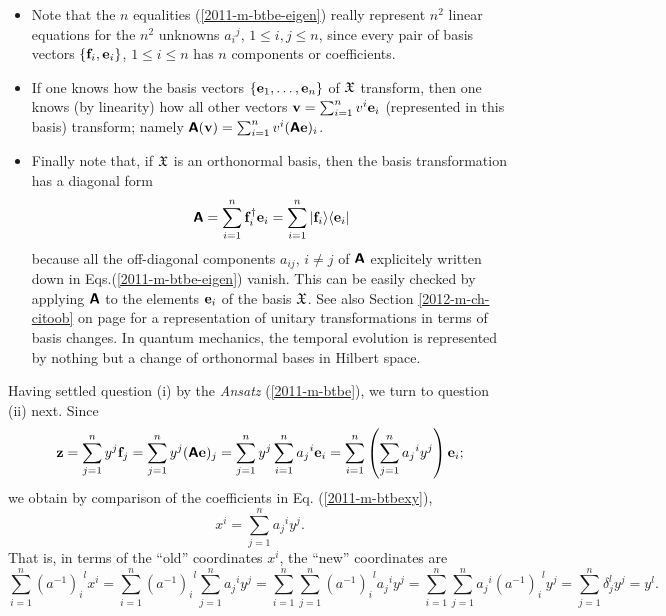 \begin{itemize}
\item
Note   that the $n$ equalities (\ref {2011-m-btbe-eigen})
really represent $n^2$ linear equations for the $n^2$
unknowns ${a_i}^j$, $1\le i,j\le n$, since every pair of basis vectors
$\{{\bf f}_i,{\bf e}_i\}$, $1\le i\le n$ has $n$ components or coefficients.

\item
If one knows how the basis vectors
$
\{
{\bf e}_1,
\ldots ,
{\bf e}_n
\}$ of ${\frak X}$    transform, then one knows (by linearity) how
all other vectors
${\bf v}=
\sum_{i=1}^n v^i{\bf e}_i
$
(represented in this basis) transform; namely
$\textsf{\textbf{A}}({\bf v})=
\sum_{i=1}^n v^i (\textsf{\textbf{A}}{\bf e})_i
$.

\item
Finally note that, if  ${\frak X}$ is an orthonormal basis,
then the basis transformation has a diagonal form
\begin{equation}
\textsf{\textbf{A}} =   \sum_{i=1}^n  {\bf f}_i^\dagger  {\bf e}_i
=
\sum_{i=1}^n \vert {\bf f}_i \rangle \langle {\bf e}_i \vert
\label{2013-m-ch-fdvs-dftm}
\end{equation}
because all the off-diagonal components $a_{ij}$, $i\neq j$ of $\textsf{\textbf{A}}$
explicitely written down in Eqs.(\ref{2011-m-btbe-eigen}) vanish.
This can be easily checked by applying $\textsf{\textbf{A}}$ to the elements ${\bf e}_i $ of the basis ${\frak X}$.
See also Section
\ref{2012-m-ch-citoob} on page \pageref{2012-m-ch-citoob}
for a representation of unitary transformations in terms of basis changes.
In quantum mechanics, the temporal evolution is represented by nothing but a change of orthonormal bases in Hilbert space.
\end{itemize}

Having settled question (i) by the {\it Ansatz}
(\ref{2011-m-btbe}),
we turn to question (ii) next.
Since
\begin{equation}
{\bf z} =
 \sum_{j=1}^n y^j {\bf f}_j=
 \sum_{j=1}^n  y^j (\textsf{\textbf{A}}{\bf e})_j=
 \sum_{j=1}^n  y^j  \sum_{i=1}^n {a_j}^i {\bf e}_i=
  \sum_{i=1}^n \left(\sum_{j=1}^n  {a_j}^i y^j \right)   {\bf e}_i;
\end{equation}
we obtain by comparison of the coefficients in Eq. (\ref{2011-m-btbexy}),
\begin{equation}
x^i= \sum_{j=1}^n {a_j}^i y^j.
\label{2012-m-ch-e-tl1}
\end{equation}
That is, in terms of the ``old'' coordinates $x^i$,
the ``new'' coordinates are
\begin{equation}
\sum_{i=1}^n {(a^{-1})_i}^l x^i= \sum_{i=1}^n {(a^{-1})_i}^l  \sum_{j=1}^n  {a_j}^i y^j
=  \sum_{i=1}^n \sum_{j=1}^n {(a^{-1})_i}^l  {a_j}^i y^j
=  \sum_{i=1}^n \sum_{j=1}^n {a_j}^i {(a^{-1})_i}^l  y^j
=   \sum_{j=1}^n \delta^l_j y^j
=  y^{l}
.
\label{2012-m-ch-e-tl2}
\end{equation}

